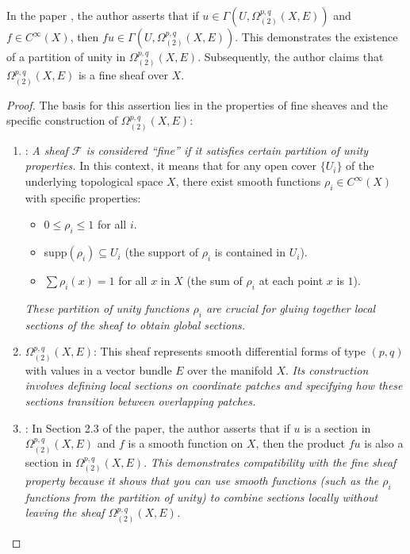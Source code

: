 \documentclass[lang=en,12pt]{beautybook}
\begin{document}
    \newcommand{\tmem}[1]{\emph{#1}}
    \begin{problem}
        In the paper \cite[\S 2.3, P7]{huang2016logarithmic}, the author asserts that if $u
        \in \Gamma (U, \Omega^{p, q}_{(2)} (X, E))$ and $f \in C^{\infty} (X)$, then
        $fu \in \Gamma (U, \Omega^{p, q}_{(2)} (X, E))$. This demonstrates the
        existence of a partition of unity in $\Omega^{p, q}_{(2)} (X, E)$.
        Subsequently, the author claims that $\Omega^{p, q}_{(2)} (X, E)$ is a fine
        sheaf over $X$.
    \end{problem}
    
    \begin{proof}
        The basis for this assertion lies in the properties of fine sheaves and the
        specific construction of $\Omega^{p, q}_{(2)} (X, E)$:
        \begin{enumerate}
            \item  {}: {\tmem{A sheaf $\mathcal{F}$ is
        considered ``fine'' if it satisfies certain partition of unity properties.}}
        In this context, it means that for any open cover $\{U_i \}$ of the
        underlying topological space $X$, there exist smooth functions $\rho_i \in
        C^{\infty} (X)$ with specific properties:
        \begin{itemize}
            \item $0 \leq \rho_i \leq 1$ for all $i$.
            \item supp$(\rho_i) \subseteq U_i$ (the support of $\rho_i$ is contained
            in $U_i$). 
            \item $\sum \rho_i (x) = 1$ for all $x$ in $X$ (the sum of $\rho_i$ at
            each point $x$ is $1$).
        \end{itemize}
        {\tmem{These partition of unity functions $\rho_i$ are crucial for gluing
        together local sections of the sheaf to obtain global sections.}}
        \item {} $\Omega^{p, q}_{(2)} (X, E)$: This sheaf
        represents smooth differential forms of type $(p, q)$ with values in a
        vector bundle $E$ over the manifold $X$. {\tmem{Its construction involves
        defining local sections on coordinate patches and specifying how these
        sections transition between overlapping patches.}}
        \item {}: In Section 2.3 of the
        paper, the author asserts that if $u$ is a section in $\Omega^{p, q}_{(2)}
        (X, E)$ and $f$ is a smooth function on $X$, then the product $fu$ is also a
        section in $\Omega^{p, q}_{(2)} (X, E)$. {\tmem{This demonstrates
        compatibility with the fine sheaf property because it shows that you can use
        smooth functions (such as the $\rho_i$ functions from the partition of
        unity) to combine sections locally without leaving the sheaf $\Omega^{p,
        q}_{(2)} (X, E)$.}}
        

\end{enumerate}
\end{proof}
\end{document}

